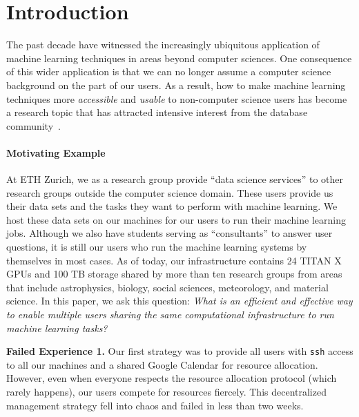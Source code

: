 \documentclass[letterpaper]{vldb}
\begin{document}
\vspace{-1em}
\section{Introduction}\label{sec:introduction}

The past decade have witnessed the increasingly 
ubiquitous application of machine learning techniques 
in areas beyond computer sciences. 
One consequence of this wider application
is that we can no longer assume a computer science 
background on the part of our users. As a result, how to make
machine learning techniques more {\em accessible} and
{\em usable} to non-computer science users has become
a research topic that has attracted intensive interest
from the database community~\cite{Tamagnini2017,Varma2017,Krishnan2017,Binnig2016,Bailis2017}.

\paragraph*{Motivating Example} At ETH Zurich,
we as a research group provide ``data science
services'' to other research groups outside the computer science domain.
These users provide
us their data sets and the tasks they 
want to perform with machine learning. We host these data sets on our machines
for our users to run their machine learning
jobs.
Although we also have students serving as ``consultants''
to answer user questions, it is still our
users who run the machine learning systems
by themselves in most cases. As of today, our infrastructure
contains 24 TITAN X GPUs and 100 TB storage
shared by more than ten research groups
from areas that include astrophysics,
biology, social sciences, meteorology, 
and material science.
In this paper, we ask this question: {\em What is an
efficient and effective way to enable multiple users sharing 
the same computational infrastructure to run
machine learning tasks?}

\vspace{0.1em}
\noindent
{\bf Failed Experience 1.} Our first strategy was to provide
all users with \texttt{ssh} access to all our machines
and a shared Google Calendar for resource allocation.
However, even when everyone respects the resource allocation
protocol (which rarely happens), our users compete for 
resources fiercely. This decentralized management strategy fell into chaos and failed in less than two weeks. 
\end{document}
